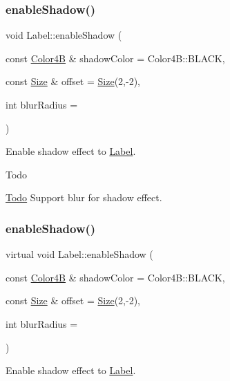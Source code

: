 \subsubsection{\texorpdfstring{enable\+Shadow()}{enableShadow()}\hspace{0.1cm}{\footnotesize\ttfamily [1/2]}}
{\footnotesize\ttfamily void Label\+::enable\+Shadow (\begin{DoxyParamCaption}\item[{const \hyperlink{structColor4B}{Color4B} \&}]{shadow\+Color = {\ttfamily Color4B\+:\+:BLACK},  }\item[{const \hyperlink{classSize}{Size} \&}]{offset = {\ttfamily \hyperlink{classSize}{Size}(2,-\/2)},  }\item[{int}]{blur\+Radius = {} }\end{DoxyParamCaption})\hspace{0.3cm}{\ttfamily [virtual]}}

Enable shadow effect to \hyperlink{classLabel}{Label}.

\begin{DoxyRefDesc}{Todo}
\item[\hyperlink{todo__todo000005}{Todo}]Support blur for shadow effect. \end{DoxyRefDesc}
\mbox{\label{classLabel_abb062f4e6a0b7b4bc50bdc6b600a5d5c}} 
\subsubsection{\texorpdfstring{enable\+Shadow()}{enableShadow()}\hspace{0.1cm}{\footnotesize\ttfamily [2/2]}}
{\footnotesize\ttfamily virtual void Label\+::enable\+Shadow (\begin{DoxyParamCaption}\item[{const \hyperlink{structColor4B}{Color4B} \&}]{shadow\+Color = {\ttfamily Color4B\+:\+:BLACK},  }\item[{const \hyperlink{classSize}{Size} \&}]{offset = {\ttfamily \hyperlink{classSize}{Size}(2,-\/2)},  }\item[{int}]{blur\+Radius = {} }\end{DoxyParamCaption})\hspace{0.3cm}{\ttfamily [virtual]}}

Enable shadow effect to \hyperlink{classLabel}{Label}.

